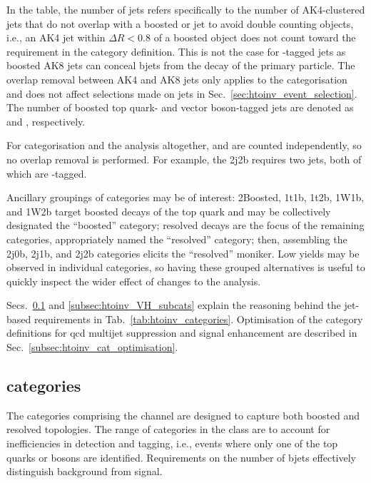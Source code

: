 In the table, the number of \glspl{jet} \njet refers specifically to the number of AK4-clustered \glspl{jet} that do not overlap with a boosted \Ptop or \PVec \gls{jet} to avoid double counting objects, i.e., an AK4 \gls{jet} within $\Delta R < \text{0.8}$ of a boosted object does not count toward the \njet requirement in the category definition. This is not the case for \Pqb-tagged \glspl{jet} as boosted AK8 \glspl{jet} can conceal \glspl{bjet} from the decay of the primary particle. The overlap removal between AK4 and AK8 \glspl{jet} only applies to the categorisation and does not affect selections made on \glspl{jet} in Sec.~\ref{sec:htoinv_event_selection}. The number of boosted top quark- and vector boson-tagged \glspl{jet} are denoted as \nBoostedTop and \nBoostedV, respectively.

For categorisation and the analysis altogether, \njet and \nbjet are counted independently, so no overlap removal is performed. For example, the \VH 2j2b requires two \glspl{jet}, both of which are \Pbottom-tagged.

Ancillary groupings of categories may be of interest: 2Boosted, 1t1b, 1t2b, 1W1b, and 1W2b target boosted decays of the top quark and may be collectively designated the ``\ttH boosted'' category; resolved decays are the focus of the remaining categories, appropriately named the ``\ttH resolved'' category; then, assembling the 2j0b, 2j1b, and 2j2b \VH categories elicits the ``\VH resolved'' moniker. Low yields may be observed in individual categories, so having these grouped alternatives is useful to quickly inspect the wider effect of changes to the analysis.

Secs.~\ref{subsec:htoinv_ttH_subcats} and \ref{subsec:htoinv_VH_subcats} explain the reasoning behind the \gls{jet}-based requirements in Tab.~\ref{tab:htoinv_categories}. Optimisation of the category definitions for \acrshort{qcd} multijet suppression and signal enhancement are described in Sec.~\ref{subsec:htoinv_cat_optimisation}.




\subsection{\texorpdfstring{\ttH}{ttH} categories}
\label{subsec:htoinv_ttH_subcats}

The categories comprising the \ttH channel are designed to capture both boosted and resolved topologies. The range of categories in the class are to account for inefficiencies in detection and tagging, i.e., events where only one of the top quarks or \PW bosons are identified. Requirements on the number of \glspl{bjet} effectively distinguish background from signal.

